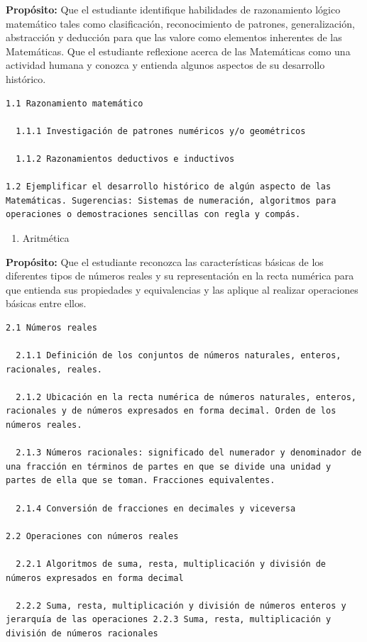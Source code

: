 \documentclass[]{book}
\providecommand{\tightlist}{%
  \setlength{\itemsep}{0pt}\setlength{\parskip}{0pt}}
\begin{document}
\textbf{Propósito:} Que el estudiante identifique habilidades de
razonamiento lógico matemático tales como clasificación, reconocimiento
de patrones, generalización, abstracción y deducción para que las valore
como elementos inherentes de las Matemáticas. Que el estudiante
reflexione acerca de las Matemáticas como una actividad humana y conozca
y entienda algunos aspectos de su desarrollo histórico.

\begin{verbatim}
1.1 Razonamiento matemático

  1.1.1 Investigación de patrones numéricos y/o geométricos

  1.1.2 Razonamientos deductivos e inductivos

1.2 Ejemplificar el desarrollo histórico de algún aspecto de las Matemáticas. Sugerencias: Sistemas de numeración, algoritmos para operaciones o demostraciones sencillas con regla y compás.
\end{verbatim}

\begin{enumerate}
\def\labelenumi{\arabic{enumi}.}
\setcounter{enumi}{1}
\tightlist
\item
  Aritmética
\end{enumerate}

\textbf{Propósito:} Que el estudiante reconozca las características
básicas de los diferentes tipos de números reales y su representación en
la recta numérica para que entienda sus propiedades y equivalencias y
las aplique al realizar operaciones básicas entre ellos.

\begin{verbatim}
2.1 Números reales

  2.1.1 Definición de los conjuntos de números naturales, enteros, racionales, reales.

  2.1.2 Ubicación en la recta numérica de números naturales, enteros, racionales y de números expresados en forma decimal. Orden de los números reales.

  2.1.3 Números racionales: significado del numerador y denominador de una fracción en términos de partes en que se divide una unidad y partes de ella que se toman. Fracciones equivalentes.

  2.1.4 Conversión de fracciones en decimales y viceversa

2.2 Operaciones con números reales

  2.2.1 Algoritmos de suma, resta, multiplicación y división de números expresados en forma decimal

  2.2.2 Suma, resta, multiplicación y división de números enteros y jerarquía de las operaciones 2.2.3 Suma, resta, multiplicación y división de números racionales
\end{verbatim}
\end{document}
